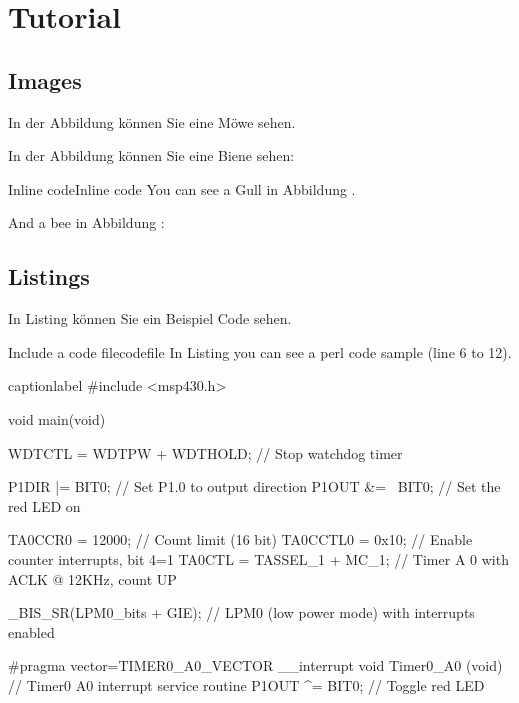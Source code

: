 \chapter{Tutorial}

\section{Images}

In der Abbildung  können Sie eine Möwe sehen.


In der Abbildung  können Sie eine Biene sehen:


\begin{code}[tex]{Inline code}{Inline code}
You can see a Gull in Abbildung .


And a bee in Abbildung :

\end{code}

\section{Listings}

In Listing  können Sie ein Beispiel Code sehen.


\begin{code}[tex]{Include a code file}{codefile}
In Listing  you can see a perl code sample (line 6 to 12).
\end{code}

\begin{code}[c]{caption}{label}
#include <msp430.h> 

void main(void) {
	WDTCTL = WDTPW + WDTHOLD; // Stop watchdog timer

	P1DIR |= BIT0; // Set P1.0 to output direction
	P1OUT &= ~BIT0; // Set the red LED on

	TA0CCR0 = 12000; // Count limit (16 bit)
	TA0CCTL0 = 0x10;	 // Enable counter interrupts, bit 4=1
	TA0CTL = TASSEL_1 + MC_1; // Timer A 0 with ACLK @ 12KHz, count UP

	_BIS_SR(LPM0_bits + GIE); // LPM0 (low power mode) with interrupts enabled
}

#pragma vector=TIMER0_A0_VECTOR
   __interrupt void Timer0_A0 (void) { // Timer0 A0 interrupt service routine
	P1OUT ^= BIT0; // Toggle red LED
}
\end{code}


